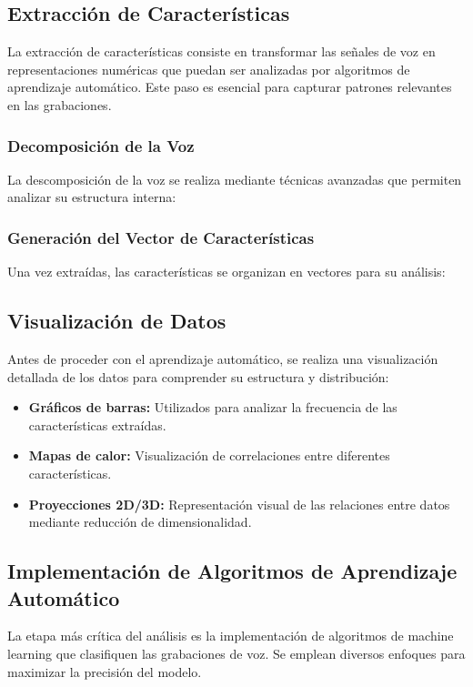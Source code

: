 \documentclass[listof=nochaptergap,12pt,times,authoryear]{report}
\begin{document}
\subsection{Extracción de Características}
La extracción de características consiste en transformar las señales de voz en representaciones numéricas que puedan ser analizadas por algoritmos de aprendizaje automático. Este paso es esencial para capturar patrones relevantes en las grabaciones.

\subsubsection{Decomposición de la Voz}
La descomposición de la voz se realiza mediante técnicas avanzadas que permiten analizar su estructura interna:


\subsubsection{Generación del Vector de Características}
Una vez extraídas, las características se organizan en vectores para su análisis:


\subsection{Visualización de Datos}
Antes de proceder con el aprendizaje automático, se realiza una visualización detallada de los datos para comprender su estructura y distribución:
\begin{itemize}
    \item \textbf{Gráficos de barras:} Utilizados para analizar la frecuencia de las características extraídas.
    \item \textbf{Mapas de calor:} Visualización de correlaciones entre diferentes características.
    \item \textbf{Proyecciones 2D/3D:} Representación visual de las relaciones entre datos mediante reducción de dimensionalidad.
\end{itemize}

\subsection{Implementación de Algoritmos de Aprendizaje Automático}
La etapa más crítica del análisis es la implementación de algoritmos de machine learning que clasifiquen las grabaciones de voz. Se emplean diversos enfoques para maximizar la precisión del modelo.
\end{document}
